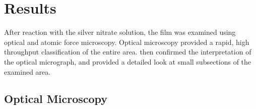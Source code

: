 \section{Results}
\label{sec:poly.reac.results}

After reaction with the silver nitrate solution, the film was examined using optical and
atomic force microscopy. Optical microscopy provided a rapid, high throughput
classification of the entire area.  then confirmed the interpretation of the
optical micrograph, and provided a detailed look at small subsections of the examined
area.


\subsection{Optical Microscopy}
\label{subsec:poly.reac.optical}


